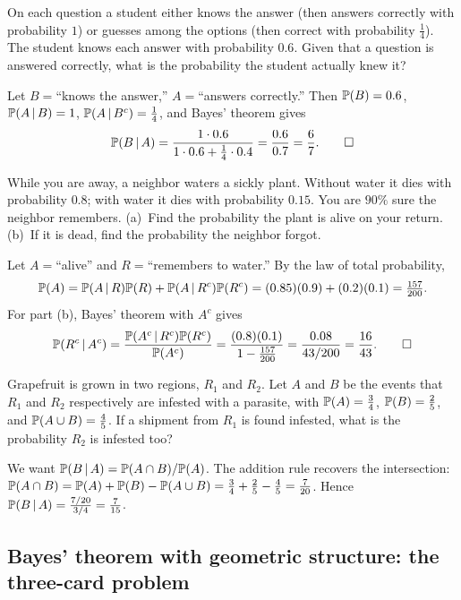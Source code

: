 \begin{example}
On each question a student either knows the answer (then answers correctly with
probability $1$) or guesses among the options (then correct with probability
$\tfrac14$). The student knows each answer with probability $0.6$. Given that a
question is answered correctly, what is the probability the student actually
knew it?

\solution Let $B=$``knows the answer,'' $A=$``answers correctly.'' Then
$\mathbb{P}(B)=0.6$, $\mathbb{P}(A\,|\, B)=1$, $\mathbb{P}(A\,|\, B^c)=\tfrac14$, and Bayes'
theorem gives
\[
  \mathbb{P}(B\,|\, A)=\frac{1\cdot 0.6}{1\cdot 0.6 + \tfrac14\cdot 0.4}
   =\frac{0.6}{0.7}=\frac{6}{7}. \qedhere
\]
\end{example}

\begin{example}
While you are away, a neighbor waters a sickly plant. Without water it dies with
probability $0.8$; with water it dies with probability $0.15$. You are $90\%$
sure the neighbor remembers. (a)~Find the probability the plant is alive on your
return. (b)~If it is dead, find the probability the neighbor forgot.

\solution Let $A=$``alive'' and $R=$``remembers to water.'' By the law of total
probability,
\[
  \mathbb{P}(A)=\mathbb{P}(A\,|\, R)\mathbb{P}(R)+\mathbb{P}(A\,|\, R^c)\mathbb{P}(R^c)
   =(0.85)(0.9)+(0.2)(0.1)=\tfrac{157}{200}.
\]
For part (b), Bayes' theorem with $A^c$ gives
\[
  \mathbb{P}(R^c\,|\, A^c)=\frac{\mathbb{P}(A^c\,|\, R^c)\mathbb{P}(R^c)}{\mathbb{P}(A^c)}
   =\frac{(0.8)(0.1)}{1-\tfrac{157}{200}}=\frac{0.08}{43/200}=\frac{16}{43}. \qedhere
\]
\end{example}

\begin{example}
Grapefruit is grown in two regions, $R_1$ and $R_2$. Let $A$ and $B$ be the
events that $R_1$ and $R_2$ respectively are infested with a parasite, with
$\mathbb{P}(A)=\tfrac34$, $\mathbb{P}(B)=\tfrac25$, and $\mathbb{P}(A\cup B)=\tfrac45$. If a
shipment from $R_1$ is found infested, what is the probability $R_2$ is infested
too?

\solution We want $\mathbb{P}(B\,|\, A)=\mathbb{P}(A\cap B)/\mathbb{P}(A)$. The addition rule
recovers the intersection:
$\mathbb{P}(A\cap B)=\mathbb{P}(A)+\mathbb{P}(B)-\mathbb{P}(A\cup B)=\tfrac34+\tfrac25-\tfrac45=\tfrac{7}{20}$.
Hence $\mathbb{P}(B\,|\, A)=\tfrac{7/20}{3/4}=\tfrac{7}{15}$.
\end{example}

\subsection{Bayes' theorem with geometric structure: the three-card problem}

